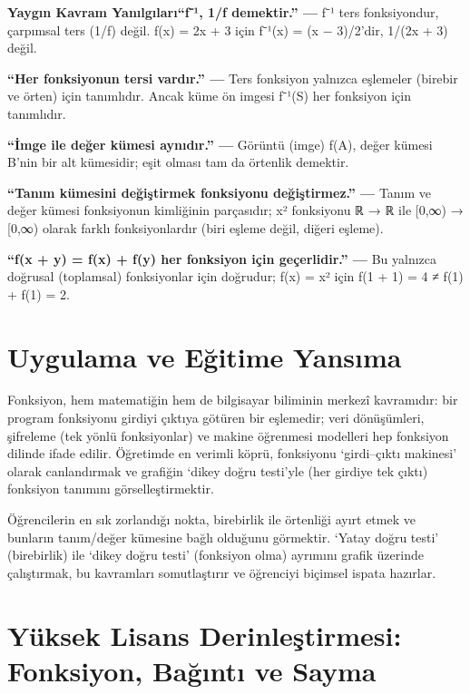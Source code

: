 \begin{tcolorbox}[bookbox,colback=cMis]\textbf{\textsf{\textcolor{cAcc}{Yaygın Kavram Yanılgıları}}}\quad \textbf{“f⁻¹, 1/f demektir.” — }f⁻¹ ters fonksiyondur, çarpımsal ters (1/f) değil. f(x) = 2x + 3 için f⁻¹(x) = (x − 3)/2’dir, 1/(2x + 3) değil.\par\medskip{}\textbf{“Her fonksiyonun tersi vardır.” — }Ters fonksiyon yalnızca eşlemeler (birebir ve örten) için tanımlıdır. Ancak küme ön imgesi f⁻¹(S) her fonksiyon için tanımlıdır.\par\medskip{}\textbf{“İmge ile değer kümesi aynıdır.” — }Görüntü (imge) f(A), değer kümesi B’nin bir alt kümesidir; eşit olması tam da örtenlik demektir.\par\medskip{}\textbf{“Tanım kümesini değiştirmek fonksiyonu değiştirmez.” — }Tanım ve değer kümesi fonksiyonun kimliğinin parçasıdır; x² fonksiyonu ℝ → ℝ ile [0,∞) → [0,∞) olarak farklı fonksiyonlardır (biri eşleme değil, diğeri eşleme).\par\medskip{}\textbf{“f(x + y) = f(x) + f(y) her fonksiyon için geçerlidir.” — }Bu yalnızca doğrusal (toplamsal) fonksiyonlar için doğrudur; f(x) = x² için f(1 + 1) = 4 ≠ f(1) + f(1) = 2.\end{tcolorbox}

\section{Uygulama ve Eğitime Yansıma}

Fonksiyon, hem matematiğin hem de bilgisayar biliminin merkezî kavramıdır: bir program fonksiyonu girdiyi çıktıya götüren bir eşlemedir; veri dönüşümleri, şifreleme (tek yönlü fonksiyonlar) ve makine öğrenmesi modelleri hep fonksiyon dilinde ifade edilir. Öğretimde en verimli köprü, fonksiyonu ‘girdi–çıktı makinesi’ olarak canlandırmak ve grafiğin ‘dikey doğru testi’yle (her girdiye tek çıktı) fonksiyon tanımını görselleştirmektir.

Öğrencilerin en sık zorlandığı nokta, birebirlik ile örtenliği ayırt etmek ve bunların tanım/değer kümesine bağlı olduğunu görmektir. ‘Yatay doğru testi’ (birebirlik) ile ‘dikey doğru testi’ (fonksiyon olma) ayrımını grafik üzerinde çalıştırmak, bu kavramları somutlaştırır ve öğrenciyi biçimsel ispata hazırlar.

\section{Yüksek Lisans Derinleştirmesi: Fonksiyon, Bağıntı ve Sayma}

